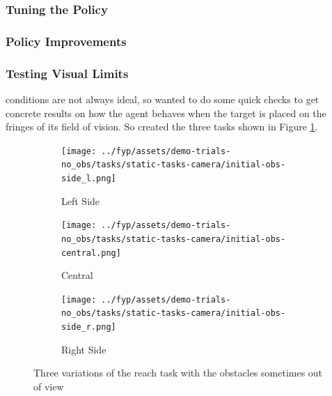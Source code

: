 \subsubsection{Tuning the Policy}

\subsubsection{Policy Improvements}



\subsubsection{Testing Visual Limits}


conditions are not always ideal, so wanted to do some quick checks to get concrete results on how the agent behaves when the target is placed on the fringes of its field of vision. So created the three tasks shown in Figure \ref{fig:no-obs-3-views}.

\begin{figure}[htbp]
  \begin{subfigure}{0.3\linewidth}
    \centering
    \texttt{[image: ../fyp/assets/demo-trials-no\_obs/tasks/static-tasks-camera/initial-obs-side\_l.png]}      
    \caption{Left Side}
  \end{subfigure}
  \hfill
  \begin{subfigure}{0.3\textwidth}
    \centering
    \texttt{[image: ../fyp/assets/demo-trials-no\_obs/tasks/static-tasks-camera/initial-obs-central.png]}
    \caption{Central}
  \end{subfigure}
  \hfill
  \begin{subfigure}{0.3\linewidth}
    \centering
    \texttt{[image: ../fyp/assets/demo-trials-no\_obs/tasks/static-tasks-camera/initial-obs-side\_r.png]}
    \caption{Right Side}
  \end{subfigure}%
  \caption{Three variations of the reach task with the obstacles sometimes out of view}\label{fig:no-obs-3-views}
\end{figure}

